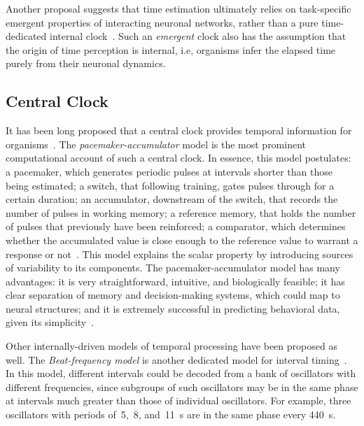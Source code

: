 \par
Another proposal suggests that time estimation ultimately relies on task-specific emergent properties of interacting neuronal networks, rather than a pure time-dedicated internal clock~\cite{Paton2018NeuronRev}.
Such an \emph{emergent} clock also has the assumption that the origin of time perception is internal, i.e, organisms infer the elapsed time purely from their neuronal dynamics.

\subsection{Central Clock}
\label{ch:intro:InternalTimeEstimation:Central}

It has been long proposed that a central clock provides temporal information for organisms~\cite{gibbon1984AnnalsNYAS, Killeen1988}.
The \emph{pacemaker-accumulator} model is the most prominent computational account of such a central clock.
In essence, this model postulates:
    a pacemaker, which generates periodic pulses at intervals shorter than those being estimated;
    a switch, that following training, gates pulses through for a certain duration;
    an accumulator, downstream of the switch, that records the number of pulses in working memory;
    a reference memory, that holds the number of pulses that previously have been reinforced;
    a comparator, which determines whether the accumulated value is close enough to the reference value to warrant a response or not~\cite{gibbon1984AnnalsNYAS}.
This model explains the scalar property by introducing sources of variability to its components.
The pacemaker-accumulator model has many advantages:
    it is very straightforward, intuitive, and biologically feasible;
    it has clear separation of memory and decision-making systems, which could map to neural structures;
    and it is extremely successful in predicting behavioral data, given its simplicity~\cite{Buhusi2005NatRevNeuro}.
\par
Other internally-driven models of temporal processing have been proposed as well.
The \emph{Beat-frequency model} is another dedicated model for interval timing~\cite{Paton2018NeuronRev}.
In this model, different intervals could be decoded from a bank of oscillators with different frequencies, since subgroups of such oscillators may be in the same phase at intervals much greater than those of individual oscillators.
For example, three oscillators with periods of~5,~8, and~11~s are in the same phase every 440~s.\footnotemark
{}
